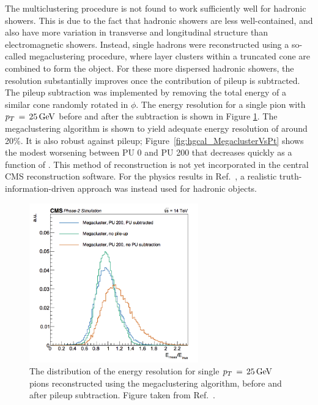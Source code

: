 The multiclustering procedure is not found to work sufficiently well for hadronic showers.
This is due to the fact that hadronic showers are less well-contained, and also have more variation in transverse and longitudinal structure than electromagnetic showers.
Instead, single hadrons were reconstructed using a so-called megaclustering procedure, where layer clusters within a truncated cone are combined to form the object. 
For these more dispersed hadronic showers, the resolution substantially improves once the contribution of pileup is subtracted.
The pileup subtraction was implemented by removing the total energy of a similar cone randomly rotated in $\phi$. 
The energy resolution for a single pion with $p_T\,=\,\SI{25}{GeV}$ before and after the subtraction is shown in Figure \ref{fig:hgcal_SingleMegacluster}. 
The megaclustering algorithm is shown to yield adequate energy resolution of around 20\%. 
It is also robust against pileup; Figure~\ref{fig:hgcal_MegaclusterVsPt} shows the modest worsening between PU 0 and PU 200 that decreases quickly as a function of \pt.
This method of reconstruction is not yet incorporated in the central CMS reconstruction software.
For the physics results in Ref.~\cite{HGCAL}, a realistic truth-information-driven approach was instead used for hadronic objects.

\begin{figure}[h!]
  \centering
  \includegraphics[width=0.65\textwidth]{Figures/HGCAL/SingleMegacluster.png}
  \caption[HGCAL pion energy response.]
  {
    The distribution of the energy resolution for single $p_T\,=\,\SI{25}{GeV}$ pions 
    reconstructed using the megaclustering algorithm, 
    before and after pileup subtraction. 
    Figure taken from Ref.~\cite{HGCAL}.
  }
  \label{fig:hgcal_SingleMegacluster}
\end{figure}

